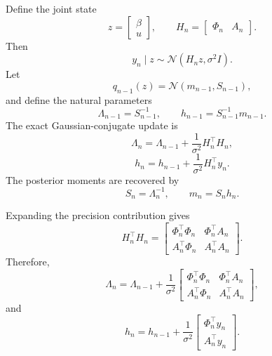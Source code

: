 \documentclass[12pt]{article}
\begin{document}
Define the joint state
\begin{equation}
z=
\begin{bmatrix}
\beta\\
u
\end{bmatrix},
\qquad
H_n=
\begin{bmatrix}
\Phi_n & A_n
\end{bmatrix}.
\label{eq:joint-state-fixed-basis}
\end{equation}
Then
\begin{equation}
y_n\mid z
\sim
\mathcal{N}(H_nz,\sigma^2I).
\end{equation}
Let
\begin{equation}
q_{n-1}(z)=\mathcal{N}(m_{n-1},S_{n-1}),
\end{equation}
and define the natural parameters
\begin{equation}
\Lambda_{n-1}=S_{n-1}^{-1},
\qquad
h_{n-1}=S_{n-1}^{-1}m_{n-1}.
\end{equation}
The exact Gaussian-conjugate update is
\begin{equation}
\Lambda_n
=
\Lambda_{n-1}
+
\frac{1}{\sigma^2}H_n^\top H_n,
\label{eq:joint-precision-update}
\end{equation}
\begin{equation}
h_n
=
h_{n-1}
+
\frac{1}{\sigma^2}H_n^\top y_n.
\label{eq:joint-info-update}
\end{equation}
The posterior moments are recovered by
\begin{equation}
S_n=\Lambda_n^{-1},
\qquad
m_n=S_nh_n.
\label{eq:joint-moment-recovery}
\end{equation}

Expanding the precision contribution gives
\begin{equation}
H_n^\top H_n
=
\begin{bmatrix}
\Phi_n^\top\Phi_n
&
\Phi_n^\top A_n
\\
A_n^\top\Phi_n
&
A_n^\top A_n
\end{bmatrix}.
\label{eq:joint-precision-blocks}
\end{equation}
Therefore,
\begin{equation}
\Lambda_n
=
\Lambda_{n-1}
+
\frac{1}{\sigma^2}
\begin{bmatrix}
\Phi_n^\top\Phi_n
&
\Phi_n^\top A_n
\\
A_n^\top\Phi_n
&
A_n^\top A_n
\end{bmatrix},
\end{equation}
and
\begin{equation}
h_n
=
h_{n-1}
+
\frac{1}{\sigma^2}
\begin{bmatrix}
\Phi_n^\top y_n\\
A_n^\top y_n
\end{bmatrix}.
\end{equation}
\end{document}
